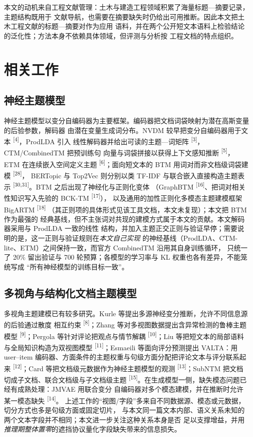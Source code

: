 \documentclass{article}
\begin{document}
本文的动机来自工程文献管理：土木与建造工程领域积累了海量标题—摘要记录，主题结构既用于
文献导航，也需要在摘要缺失时仍给出可用推断。因此本文把土木工程文献的标题—摘要对作为应用
语料，并在两个公开短文本语料上检验结论的泛化性；方法本身不依赖具体领域，但评测与分析按
工程文档的特点组织。

\section{相关工作}

\subsection{神经主题模型}

神经主题模型以变分自编码器为主要框架。编码器把文档词袋映射为潜在高斯变量的后验参数，解码器
由潜在变量生成词分布。NVDM 较早把变分自编码器用于文本 \textsuperscript{[4]}，ProdLDA 引入
线性解码器并给出可读的主题—词矩阵 \textsuperscript{[3]}，CTM/CombinedTM 把预训练句
向量与词袋拼接以获得上下文感知推断 \textsuperscript{[5]}，ETM 在连续嵌入空间定义主题
\textsuperscript{[6]}；面向短文本的 BTM 用词对而非文档级词袋建模 \textsuperscript{[28]}，
BERTopic 与 Top2Vec 则分别以类 TF-IDF 与联合嵌入直接构造主题表示
\textsuperscript{[30,31]}。BTM 之后出现了神经化与正则化变体
（GraphBTM \textsuperscript{[16]}、把词对相关性知识写入先验的 BCK-TM \textsuperscript{[17]}），
以及通用的加性正则化多模态主题建模框架 BigARTM \textsuperscript{[18]}
（其正则项的具体形式见该工具文档，本文未复现）；本文把 BTM 作为最强的
经典基线，但不主张词对共现的建模方式属于本文的贡献。本文解码器采用与 ProdLDA 一致的线性
结构，并加入主题正交正则与验证早停；需要说明的是，这一正则与验证规则在\emph{本文自己实现}
的神经基线（ProdLDA、CTM-lite、ETM）之间保持一致，而官方 CombinedTM 沿用其自身训练循环，
只统一了 20\% 留出验证与 700 轮预算；各模型的学习率与 KL 权重也各有差异，不能笼统写成
“所有神经模型的训练目标一致”。

\subsection{多视角与结构化文档主题模型}

多视角主题建模已有较多研究。Kurle 等提出多源神经变分推断，允许不同信息源的后验通过散度
相互约束 \textsuperscript{[8]}；Zhang 等对多视图数据提出含异常检测的鲁棒主题模型
\textsuperscript{[9]}；Pergola 等针对评论把观点与情节解耦
\textsuperscript{[10]}；Liu 等把短文本的局部语料与全局知识构造为双视图模型
\textsuperscript{[11]}；Esmaeili 等面向评分预测提出 VALTA：用 user--item 编码器、方面条件的主题权重与句级方面分配把评论文本与评分联系起来
\textsuperscript{[12]}；Card 等把文档级元数据作为神经主题模型的观测
\textsuperscript{[13]}；SubNTM 把文档切成子文档、联合文档级与子文档级主题
\textsuperscript{[15]}。在生成模型一侧，缺失模态问题已经有成熟处理：JMVAE 用联合变分
自编码器对多个模态建模，并在推断时允许某一模态缺失 \textsuperscript{[14]}。
上述工作的“视图/字段”多来自不同数据源、模态或元数据，切分方式也多是句级方面或固定切片，
与本文同一篇文本内部、语义关系未知的两个文本字段并不相同；本文进一步关注这种关系本身是否
足以支撑增益，并用\emph{推理期整体置零}的遮挡协议量化字段缺失带来的信息损失。
\end{document}
